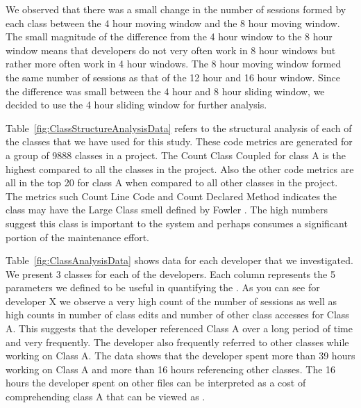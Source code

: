 We observed that there was a small change in the number of sessions formed by each class between the 4 hour moving window and the 8 hour moving window. The small magnitude of the difference from the 4 hour window to the 8 hour window means that developers do not very often work in 8 hour windows but rather more often work in 4 hour windows. The 8 hour moving window formed the same number of sessions as that of the 12 hour and 16 hour window. Since the difference was small between the 4 hour and 8 hour sliding window, we decided to use the 4 hour sliding window for further analysis.

Table~\ref{fig:ClassStructureAnalysisData} refers to the structural analysis of each of the classes that we have used for this study.  These code metrics are generated for a group of 9888 classes in a project. The Count Class Coupled for class A is the highest compared to all the classes in the project. Also the other code metrics are all in the top 20 for class A when compared to all other classes in the project. The metrics such Count Line Code and Count Declared Method indicates the class may have the Large Class smell defined by Fowler \cite{Fowler_etal:1999}.   The high numbers suggest this class is important to the system and perhaps consumes a significant portion of the maintenance effort. 

Table~\ref{fig:ClassAnalysisData} shows data for each developer that we investigated. We present 3 classes for each of the developers. Each column represents the 5 parameters we defined to be useful in quantifying the \TD. As you can see for developer X we observe a very high count of the number of sessions as well as high counts in number of class edits and number of other class accesses for Class A. This suggests that the developer referenced Class A over a long period of time and very frequently. The developer also frequently referred to other classes while working on Class A. The data shows that the developer spent more than 39 hours working on Class A and more than 16 hours referencing other classes. The 16 hours the developer spent on other files can be interpreted as a cost of comprehending class A that can be viewed as  \TD. 

